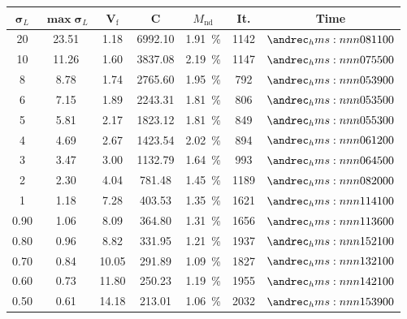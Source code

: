 \begin{table}[]
    \centering
    \begin{tabular}{S[table-format = 2.2]
                    S[table-format = 2.2]
                    S[table-format = 2.2]
                    S[table-format = 5.0]
                    S[table-format = 1.2]
                    S[table-format = 4.0]
                    c
                    }
    \toprule
    $\bm \sigma_L$ & $\bm \max \bm \sigma_L$   & $\bm V_\text{f}$     & $\bm C$ & $M_\text{nd}$  & {\textbf{It.}}  & {\textbf{Time}}      \\     & 23.51 & 1.18       & 6992.10    & \qty{1.91}{\percent} & 1142     & $\hms{08;11;00}$ \\
    10    & 11.26 & 1.60       & 3837.08    & \qty{2.19}{\percent} & 1147     & $\hms{07;55;00}$ \\
    8     & 8.78  & 1.74       & 2765.60    & \qty{1.95}{\percent} & 792      & $\hms{05;39;00}$ \\
    6     & 7.15  & 1.89       & 2243.31    & \qty{1.81}{\percent} & 806      & $\hms{05;35;00}$ \\
    5     & 5.81  & 2.17       & 1823.12    & \qty{1.81}{\percent} & 849      & $\hms{05;53;00}$ \\
    4     & 4.69  & 2.67       & 1423.54    & \qty{2.02}{\percent} & 894      & $\hms{06;12;00}$ \\
    3     & 3.47  & 3.00       & 1132.79    & \qty{1.64}{\percent} & 993      & $\hms{06;45;00}$ \\
    2     & 2.30  & 4.04       & 781.48     & \qty{1.45}{\percent} & 1189     & $\hms{08;20;00}$ \\
    1     & 1.18  & 7.28       & 403.53     & \qty{1.35}{\percent} & 1621     & $\hms{11;41;00}$ \\
    0.90  & 1.06  & 8.09       & 364.80     & \qty{1.31}{\percent} & 1656     & $\hms{11;36;00}$ \\
    0.80  & 0.96  & 8.82       & 331.95     & \qty{1.21}{\percent} & 1937     & $\hms{15;21;00}$ \\
    0.70  & 0.84  & 10.05      & 291.89     & \qty{1.09}{\percent} & 1827     & $\hms{13;21;00}$ \\
    0.60  & 0.73  & 11.80      & 250.23     & \qty{1.19}{\percent} & 1955     & $\hms{14;21;00}$ \\
    0.50  & 0.61  & 14.18      & 213.01     & \qty{1.06}{\percent} & 2032     & $\hms{15;39;00}$ \\

\end{tabular}
\end{table}
